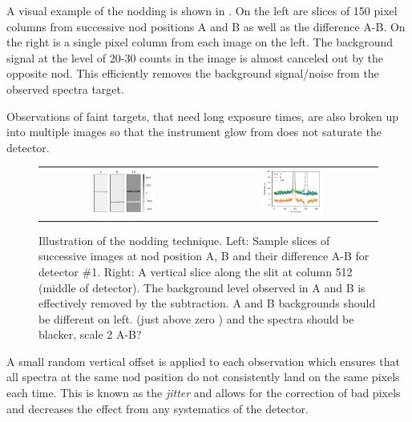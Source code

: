 A visual example of the nodding is shown in . On the left are slices of 150 pixel columns from successive nod positions A and B as well as the difference A-B. On the right is a single pixel column from each image on the left. The background signal at the level of 20-30 counts in the image is almost canceled out by the opposite nod. This efficiently removes the background signal/noise from the observed spectra target. 

Observations of faint targets, that need long exposure times, are also broken up into multiple images so that the instrument glow from  does not saturate the detector.

\begin{figure}
    \centering
    \begin{tabular}{cc}
        \includegraphics[width=0.4\textwidth]{figures/reduction/nod_image_sample.pdf} &
        \includegraphics[width=0.37\textwidth]{figures/reduction/nod_slice_example.pdf}\\
    \end{tabular}
    \caption{Illustration of the nodding technique. Left: Sample slices of successive images at nod position A, B and their difference A-B for detector \#1. Right: A vertical slice along the slit at column 512 (middle of detector). The background level observed in A and B is effectively removed by the subtraction. {\red A and B backgrounds should be different on left. (just above zero ) and the spectra should be blacker, scale 2 A-B?}}
    \label{fig:nodimages}
\end{figure}

A small random vertical offset is applied to each observation which ensures that all spectra at the same nod position do not consistently land on the same pixels each time. This is known as the \emph{jitter} and allows for the correction of bad pixels and decreases the effect from any systematics of the detector.

